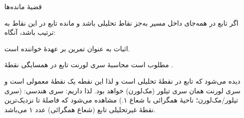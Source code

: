 \EMhold


\begin{EMtheorem}{قضیهٔ مانده‌ها}

اگر تابع  در همه‌جای داخل مسیر  به‌جز نقاط  تحلیلی باشد و مانده تابع در این نقاط به ترتیب  باشد، آنگاه:

\end{EMtheorem}


اثبات به عنوان تمرین بر عهدهٔ خواننده است.

\EMhold


\begin{EMexample}{}

مطلوب است محاسبهٔ سری لورنت تابع  در همسایگی نقطهٔ .

دیده می‌شود که تابع  در نقطهٔ  تحلیلی است و لذا این نقطه یک نقطهٔ معمولی است و سری لورنت همان سری تیلور (مک‌لورن) خواهد بود. لذا داریم:
سری هندسی:
(سری تیلور/مک‌لورن؛ ناحیهٔ همگرائی با شعاع ۱.)
مشاهده می‌شود که فاصلهٔ  تا نزدیک‌ترین نقطهٔ غیرتحلیلی تابع (شعاع همگرائی) عدد ۱ می‌باشد.

\end{EMexample}


